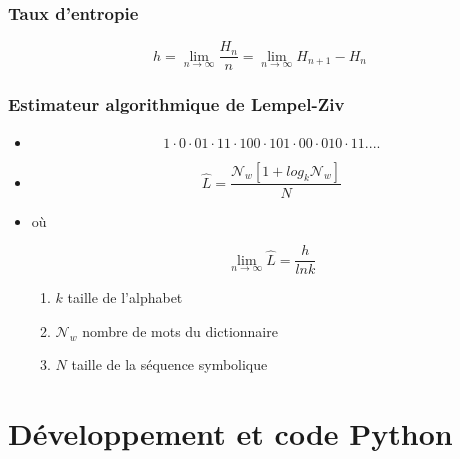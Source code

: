\documentclass{beamer}
\begin{document}
\begin{frame}
\frametitle{Taux d'entropie}
\begin{equation}
    h = \lim_{n \to \infty}\frac{H_n}{n} = \lim_{n \to \infty}H_{n+1} - H_n \label{eq:convergence2}
\end{equation}
\end{frame}

\begin{frame}
\frametitle{Estimateur algorithmique de Lempel-Ziv}
\begin{itemize}
\item<1->
\begin{equation}
    1 \cdot 0 \cdot 01 \cdot 11 \cdot 100 \cdot 101 \cdot 00 \cdot 010 \cdot 11... .
\end{equation}

\item<2->
\begin{equation}
    \hat{L} = \frac{\mathcal{N}_w[1 + log_k\mathcal{N}_w]}{N}
\end{equation}

\item<3-> où

\begin{equation}
    \lim_{n \to \infty} \hat{L} = \frac{h}{lnk} \label{eq:lempelziv}
\end{equation}

\begin{enumerate}
	\item $k$ taille de l'alphabet
	\item $\mathcal{N}_w$ nombre de mots du dictionnaire
	\item $N$ taille de la séquence symbolique
\end{enumerate}
\end{itemize}
\end{frame}

\section{Développement et code Python}
\end{document}
